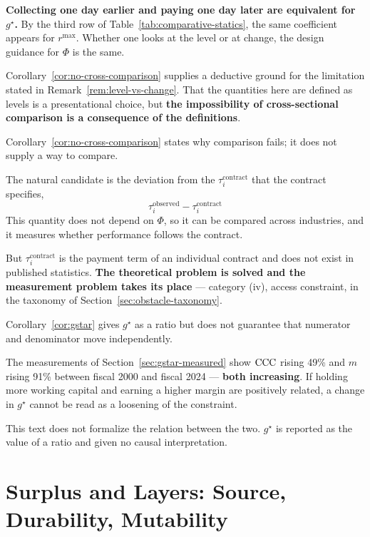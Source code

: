 \textbf{Collecting one day earlier and paying one day later are equivalent for $g^\star$.}
By the third row of Table~\ref{tab:comparative-statics}, the same coefficient appears for
$r^{\max}$. Whether one looks at the level or at change, the design guidance for $\Phi$ is
the same.

Corollary~\ref{cor:no-cross-comparison} supplies a deductive ground for the limitation
stated in Remark~\ref{rem:level-vs-change}. That the quantities here are defined as levels
is a presentational choice, but \textbf{the impossibility of cross-sectional comparison is a
consequence of the definitions}.

\begin{remark}
\label{rem:no-normalization}
Corollary~\ref{cor:no-cross-comparison} states why comparison fails; it does not supply a
way to compare.

The natural candidate is the deviation from the $\tau_i^{\mathrm{contract}}$ that the
contract specifies,
\[
\tau_i^{\mathrm{observed}} - \tau_i^{\mathrm{contract}}
\]
This quantity does not depend on $\Phi$, so it can be compared across industries, and it
measures whether performance follows the contract.

But $\tau_i^{\mathrm{contract}}$ is the payment term of an individual contract and does not
exist in published statistics. \textbf{The theoretical problem is solved and the measurement
problem takes its place} --- category (iv), access constraint, in the taxonomy of
Section~\ref{sec:obstacle-taxonomy}.
\end{remark}

\begin{remark}
\label{rem:m-ccc-independence}
Corollary~\ref{cor:gstar} gives $g^\star$ as a ratio but does not guarantee that numerator
and denominator move independently.

The measurements of Section~\ref{sec:gstar-measured} show $\mathrm{CCC}$ rising 49\% and $m$ rising
91\% between fiscal 2000 and fiscal 2024 --- \textbf{both increasing}. If holding more
working capital and earning a higher margin are positively related, a change in $g^\star$
cannot be read as a loosening of the constraint.

This text does not formalize the relation between the two. $g^\star$ is reported as the
value of a ratio and given no causal interpretation.
\end{remark}

\chapter{Surplus and Layers: Source, Durability, Mutability}
\label{sec:surplus}

